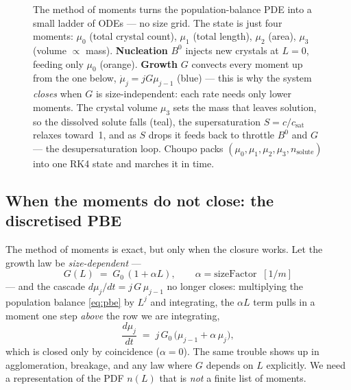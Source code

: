 \documentclass[11pt,a4paper]{article}
\begin{document}
\begin{figure}[h]
\caption{The method of moments turns the population-balance PDE into a
small ladder of ODEs --- no size grid.  The state is just four moments:
$\mu_0$ (total crystal count), $\mu_1$ (total length), $\mu_2$ (area),
$\mu_3$ (volume $\propto$ mass).  \textbf{Nucleation} $B^0$ injects new
crystals at $L{=}0$, feeding only $\mu_0$ (orange).  \textbf{Growth}
$G$ convects every moment up from the one below, $\dot\mu_j=jG\mu_{j-1}$
(blue) --- this is why the system \emph{closes} when $G$ is
size-independent: each rate needs only lower moments.  The crystal
volume $\mu_3$ sets the mass that leaves solution, so the dissolved
solute falls (teal), the supersaturation $S=c/c_{\text{sat}}$ relaxes
toward~1, and as $S$ drops it feeds back to throttle $B^0$ and $G$ ---
the desupersaturation loop.  Choupo packs $(\mu_0,\mu_1,\mu_2,\mu_3,
n_{\text{solute}})$ into one RK4 state and marches it in time.}
\label{fig:crystalliser-moments}
\end{figure}

\subsection{When the moments do not close: the discretised
PBE}\label{ch:crystalliser-fvm}

The method of moments is exact, but only when the closure works.  Let
the growth law be \emph{size-dependent} ---
\begin{equation}
   G(L) \;=\; G_0\,(1 + \alpha L),
   \qquad \alpha = \text{sizeFactor} \;\;[1/m]
\end{equation}
--- and the cascade $d\mu_j/dt = j\,G\,\mu_{j-1}$ no longer closes:
multiplying the population balance \eqref{eq:pbe} by $L^j$ and
integrating, the $\alpha L$ term pulls in a moment one step \emph{above}
the row we are integrating,
\begin{equation}
   \frac{d\mu_j}{dt} \;=\; j\,G_0\,\bigl(\mu_{j-1} + \alpha\,\mu_j\bigr),
\end{equation}
which is closed only by coincidence ($\alpha=0$).  The same trouble
shows up in agglomeration, breakage, and any law where $G$ depends on
$L$ explicitly.  We need a representation of the PDF $n(L)$ that is
\emph{not} a finite list of moments.
\end{document}
